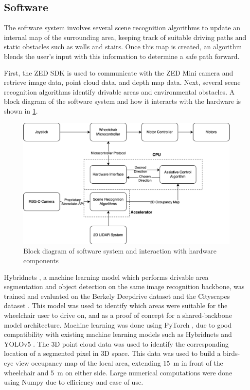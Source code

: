 \subsection{Software}
The software system involves several scene recognition algorithms to update an internal
map of the surrounding area, keeping track of suitable driving paths and static obstacles
such as walls and stairs. Once this map is created, an algorithm blends the
user's input with this information to determine a safe path forward.

First, the ZED SDK is used to communicate with the ZED Mini camera and retrieve image data,
point cloud data, and depth map data. Next, several scene recognition algorithms
identify drivable areas and environmental obstacles. A block diagram of the software system
and how it interacts with the hardware is shown in \cref{fig:block_diagram}.

\begin{figure}[b]
    \centering
    \includegraphics[width=0.9\linewidth]{images/block_diagram.png}
    \caption{Block diagram of software system and interaction with hardware components}
    \label{fig:block_diagram}
\end{figure}

Hybridnets \cite{vuHybridNetsEndtoEndPerception2022},
a machine learning model which performs drivable area segmentation and object detection on the same
image recognition backbone, was trained and evaluated on the Berkely Deepdrive dataset \cite{yuBDD100KDiverseDriving2018}
and the Cityscapes dataset \cite{cordtsCityscapesDatasetSemantic2016}. This model was used to identify
which areas were suitable for the wheelchair user to drive on,
and as a proof of concept for a shared-backbone model architecture.
Machine learning was done using PyTorch \cite{paszkePyTorchImperativeStyle2019}, due to good compatibility
with existing machine learning models such as Hybridnets and YOLOv5 \cite{ultralyticsYOLOv5}.
\pagebreak
The 3D point cloud data was used to identify the corresponding location of a segmented pixel in 3D space.
This data was used to build a birds-eye view occupancy map of the local area, extending \SI{15}{\metre}
in front of the wheelchair and \SI{5}{\metre} on either side.
Large numerical computations were done using Numpy due to efficiency and ease of use.

